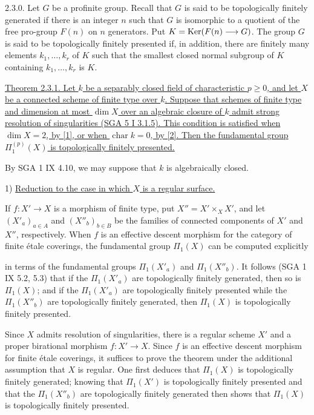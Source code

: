 2.3.0. Let $G$ be a profinite group. Recall that $G$ is said to be
topologically finitely generated if there is an integer $n$ such that
$G$ is isomorphic to a quotient of the free pro-group $F(n)$ on $n$
generators. Put $K=\operatorname{Ker}(F(n)\longrightarrow G)$. The group $G$ is said
to be topologically finitely presented if, in addition, there are
finitely many elements $k_1,\ldots,k_r$ of $K$ such that the smallest
closed normal subgroup of $K$ containing $k_1,\ldots,k_r$ is $K$.

\underline{Theorem 2.3.1. Let $k$ be a separably closed field of
characteristic $p\geq 0$, and let $X$ be a connected scheme of finite
type over $k$. Suppose that schemes of finite type and dimension at most
$\dim X$ over an algebraic closure of $k$ admit strong resolution of
singularities (SGA 5 I 3.1.5). This condition is satisfied when
$\dim X=2$, by [1], or when $\operatorname{char}k=0$, by [2]. Then the
fundamental group $\Pi_1^{(p)}(X)$ is topologically finitely presented.}

By SGA 1 IX 4.10, we may suppose that $k$ is algebraically closed.

1) \underline{Reduction to the case in which $X$ is a regular surface.}

If $f:X'\longrightarrow X$ is a morphism of finite type, put
$X''=X'\times_X X'$, and let $(X'_a)_{a\in A}$ and
$(X''_b)_{b\in B}$ be the families of connected components of $X'$ and
$X''$, respectively. When $f$ is an effective descent morphism for the
category of finite \'etale coverings, the fundamental group $\Pi_1(X)$
can be computed explicitly


in terms of the fundamental groups $\Pi_1(X'_a)$ and $\Pi_1(X''_b)$.
It follows (SGA 1 IX 5.2, 5.3) that if the $\Pi_1(X'_a)$ are
topologically finitely generated, then so is $\Pi_1(X)$; and if the
$\Pi_1(X'_a)$ are topologically finitely presented while the
$\Pi_1(X''_b)$ are topologically finitely generated, then $\Pi_1(X)$ is
topologically finitely presented.

Since $X$ admits resolution of singularities, there is a regular scheme
$X'$ and a proper birational morphism $f:X'\longrightarrow X$. Since
$f$ is an effective descent morphism for finite \'etale coverings, it
suffices to prove the theorem under the additional assumption that $X$
is regular. One first deduces that $\Pi_1(X)$ is topologically finitely
generated; knowing that $\Pi_1(X')$ is topologically finitely presented
and that the $\Pi_1(X''_b)$ are topologically finitely generated then
shows that $\Pi_1(X)$ is topologically finitely presented.

